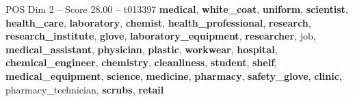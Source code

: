 \begin{textsample}{POS Dim 2 – Score 28.00 – t013397}  \label{ex:f2_pos_031}
\textbf{medical}, \textbf{white\_coat}, \textbf{uniform}, \textbf{scientist}, \textbf{health\_care}, \textbf{laboratory}, \textbf{chemist}, \textbf{health\_professional}, \textbf{research}, \textbf{research\_institute}, \textbf{glove}, \textbf{laboratory\_equipment}, \textbf{researcher}, job, \textbf{medical\_assistant}, \textbf{physician}, \textbf{plastic}, \textbf{workwear}, \textbf{hospital}, \textbf{chemical\_engineer}, \textbf{chemistry}, \textbf{cleanliness}, \textbf{student}, \textbf{shelf}, \textbf{medical\_equipment}, \textbf{science}, \textbf{medicine}, \textbf{pharmacy}, \textbf{safety\_glove}, \textbf{clinic}, pharmacy\_technician, \textbf{scrubs}, \textbf{retail}

\end{textsample}
